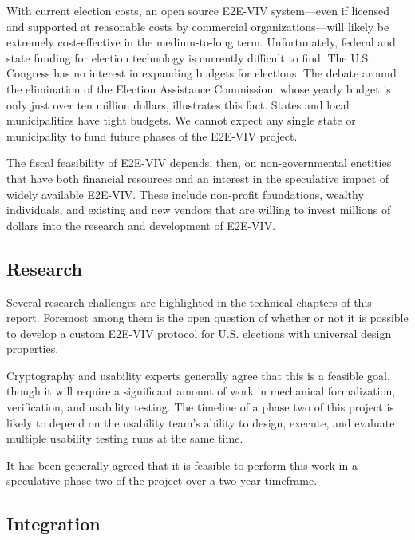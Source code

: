 With current election costs, an open source E2E-VIV system---even if
licensed and supported at reasonable costs by commercial
organizations---will likely be extremely cost-effective in the
medium-to-long term. Unfortunately, federal and state funding for
election technology is currently difficult to find.  The U.S. Congress
has no interest in expanding budgets for elections. The debate around
the elimination of the Election Assistance Commission, whose yearly
budget is only just over ten million dollars, illustrates this
fact. States and local municipalities have tight budgets. We cannot
expect any single state or municipality to fund future phases of the
E2E-VIV project.

The fiscal feasibility of E2E-VIV depends, then, on non-governmental
enetities that have both financial resources and an interest in the
speculative impact of widely available E2E-VIV.  These include
non-profit foundations, wealthy individuals, and existing and new
vendors that are willing to invest millions of dollars into the
research and development of E2E-VIV.

\subsection{Research}

Several research challenges are highlighted in the technical chapters
of this report.  Foremost among them is the open question of whether
or not it is possible to develop a custom E2E-VIV protocol for
U.S. elections with universal design properties.

Cryptography and usability experts generally agree that this is a
feasible goal, though it will require a significant amount of work in
mechanical formalization, verification, and usability testing. The
timeline of a phase two of this project is likely to depend on the
usability team's ability to design, execute, and evaluate multiple
usability testing runs at the same time.

It has been generally agreed that it is feasible to perform this work
in a speculative phase two of the project over a two-year timeframe.

\subsection{Integration}

